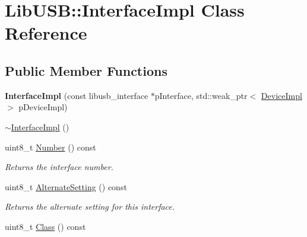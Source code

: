 \hypertarget{class_lib_u_s_b_1_1_interface_impl}{\section{Lib\-U\-S\-B\-:\-:Interface\-Impl Class Reference}
\label{class_lib_u_s_b_1_1_interface_impl}
}
\subsection*{Public Member Functions}
\begin{DoxyCompactItemize}
\item 
\hypertarget{class_lib_u_s_b_1_1_interface_impl_adc39b13c3b9ad9971f2cf4d747d18ce5}{{\bfseries Interface\-Impl} (const libusb\-\_\-interface $\ast$p\-Interface, std\-::weak\-\_\-ptr$<$ \hyperlink{class_lib_u_s_b_1_1_device_impl}{Device\-Impl} $>$ p\-Device\-Impl)}\label{class_lib_u_s_b_1_1_interface_impl_adc39b13c3b9ad9971f2cf4d747d18ce5}

\item 
\hyperlink{class_lib_u_s_b_1_1_interface_impl_ac39d098fbebc024d3f1a3b0ee7670007}{$\sim$\-Interface\-Impl} ()
\item 
\hypertarget{class_lib_u_s_b_1_1_interface_impl_a03d7483de08f48f1ce00fd89efac5827}{uint8\-\_\-t \hyperlink{class_lib_u_s_b_1_1_interface_impl_a03d7483de08f48f1ce00fd89efac5827}{Number} () const }\label{class_lib_u_s_b_1_1_interface_impl_a03d7483de08f48f1ce00fd89efac5827}

\begin{DoxyCompactList}\small\item\em Returns the interface number. \end{DoxyCompactList}\item 
\hypertarget{class_lib_u_s_b_1_1_interface_impl_a4a8737d90c753a33f3e14339c438a462}{uint8\-\_\-t \hyperlink{class_lib_u_s_b_1_1_interface_impl_a4a8737d90c753a33f3e14339c438a462}{Alternate\-Setting} () const }\label{class_lib_u_s_b_1_1_interface_impl_a4a8737d90c753a33f3e14339c438a462}

\begin{DoxyCompactList}\small\item\em Returns the alternate setting for this interface. \end{DoxyCompactList}\item 
\hypertarget{class_lib_u_s_b_1_1_interface_impl_a081dae4a2eb6df4ef6024d5349f34089}{uint8\-\_\-t \hyperlink{class_lib_u_s_b_1_1_interface_impl_a081dae4a2eb6df4ef6024d5349f34089}{Class} () const }\label{class_lib_u_s_b_1_1_interface_impl_a081dae4a2eb6df4ef6024d5349f34089}


\end{DoxyCompactItemize}
